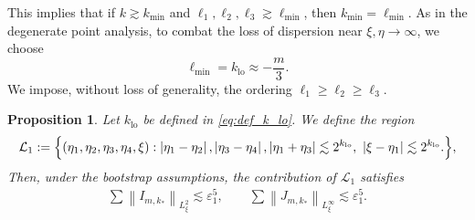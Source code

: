 \documentclass[reqno,english,11pt]{amsart}
\newcommand{\eps}{\varepsilon}
\newcommand{\snorm}[1]{\left\|#1\right\|}
\newtheorem{proposition}[theorem]{Proposition}
\theoremstyle{definition}
\numberwithin{equation}{section}
\begin{document}
This implies that if $k\gtrsim k_{\text{min}}$ and $\ell_1, \ell_2, \ell_3 \gtrsim \ell_{\text{min}}$, then $k_{\text{min}} =  \ell_{\text{min}}$.  As in the degenerate point analysis, to combat the loss of dispersion near $\xi, \eta \to \infty$, we choose$$\ell_{\text{min}} = k_{\operatorname{lo}} \approx -\frac{m}{3}.$$
We impose, without loss of generality, the ordering
$\ell_1 \ge \ell_2 \ge \ell_3$.
\begin{proposition}\label{prop:STR_line_case_1}
Let $k_{\operatorname{lo}}$ be defined in \eqref{eq:def_k_lo}.
We define the region
$$\mathcal{L}_{1}:= \Bigl\{(\eta_1,\eta_2,\eta_3,\eta_4,\xi):\left|\eta_1-\eta_2\right|, \left|\eta_3-\eta_4\right|, \left|\eta_1+\eta_3\right| \lesssim 2^{k_{\operatorname{lo}}},\ |\xi-\eta_1| \lesssim 2^{k_{\operatorname{lo}}}.\Bigr\},$$
Then, under the bootstrap assumptions, the contribution of $\mathcal{L}_1$ satisfies
    \begin{align*}
        \sum\snorm{I_{m,k_*}}_{L^2_\xi}\lesssim \eps_1^5,\qquad \sum\snorm{J_{m,k_*}}_{L^\infty_\xi}\lesssim \eps_1^5.
    \end{align*}
\end{proposition}
\end{document}
